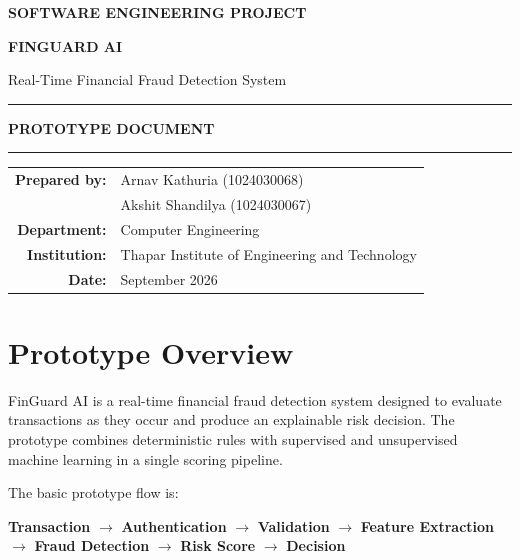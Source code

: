 \documentclass[11pt,a4paper]{article}
\begin{document}
\begin{titlepage}
\centering
\vspace*{1.5cm}

{\Large\bfseries SOFTWARE ENGINEERING PROJECT\par}
\vspace{0.8cm}
{\Huge\bfseries FINGUARD AI\par}
\vspace{0.25cm}
{\Large Real-Time Financial Fraud Detection System\par}

\vspace{0.9cm}
\rule{0.75\textwidth}{0.6pt}\par
\vspace{0.4cm}
{\Large\bfseries PROTOTYPE DOCUMENT\par}
\vspace{0.4cm}
\rule{0.75\textwidth}{0.6pt}\par

\vfill

\begin{tabular}{rl}
\textbf{Prepared by:} & Arnav Kathuria (1024030068)\\
& Akshit Shandilya (1024030067)\\[0.2cm]
\textbf{Department:} & Computer Engineering\\
\textbf{Institution:} & Thapar Institute of Engineering and Technology\\[0.2cm]
\textbf{Date:} & September 2026
\end{tabular}

\vfill
\end{titlepage}

\section{Prototype Overview}

FinGuard AI is a real-time financial fraud detection system designed to evaluate transactions
as they occur and produce an explainable risk decision. The prototype combines deterministic
rules with supervised and unsupervised machine learning in a single scoring pipeline.

The basic prototype flow is:

\begin{center}
\textbf{Transaction}
$\rightarrow$
\textbf{Authentication}
$\rightarrow$
\textbf{Validation}
$\rightarrow$
\textbf{Feature Extraction}
$\rightarrow$
\textbf{Fraud Detection}
$\rightarrow$
\textbf{Risk Score}
$\rightarrow$
\textbf{Decision}
\end{center}
\end{document}
